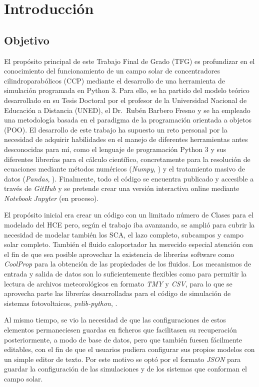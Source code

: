 \chapter{Introducción}
\label{introduccion}

\section{Objetivo}
El propósito principal de este Trabajo Final de Grado (TFG) es profundizar en el conocimiento del funcionamiento de un campo solar de concentradores cilindroparabólicos (CCP) mediante el desarrollo de una herramienta de simulación programada en Python 3. Para ello, se ha partido del modelo teórico desarrollado en su Tesis Doctoral por el profesor de la Universidad Nacional de Educación a Distancia (UNED), el Dr.~Rubén Barbero Fresno y se ha empleado una metodología basada en el paradigma de la programación orientada a objetos (POO). El desarrollo de este trabajo ha supuesto un reto personal por la necesidad de adquirir habilidades en el manejo de diferentes herramientas antes desconocidas para mí, como el lenguaje de programación Python 3 \cite{WelcomePythonOrg} y sus diferentes librerías para el cálculo científico, concretamente para la resolución de ecuaciones mediante métodos numéricos (\emph{Numpy}, \cite{NumPy}) y el tratamiento masivo de datos (\emph{Pandas},  \cite{PandasPythonData}). Finalmente, todo el código se encuentra publicado y accesible a través de \emph{GitHub} y se pretende crear una versión interactiva online mediante \emph{Notebook Jupyter} (en proceso).

El propósito inicial era crear un código con un limitado número de Clases para el modelado del HCE pero, según el trabajo iba avanzando, se amplió para cubrir la necesidad de modelar también los SCA, el lazo completo, subcampos y campo solar completo. También el fluido caloportador ha merecido especial atención con el fin de que sea posible aprovechar la existencia de librerías software como \emph{CoolProp} \cite{bellPurePseudopureFluid2014} para la obtención  de las propiedades de los fluidos. Los  mecanismos de entrada y salida de datos son lo suficientemente flexibles como para permitir la lectura de archivos meteorológicos en formato \emph{TMY} y \emph{CSV}, para lo que se aprovecha parte las librerías desarrolladas para el código de simulación de sistemas fotovoltaicos, \emph{pvlib-python}, \cite{holmgrenPvlibPythonPython2018}.

Al mismo tiempo, se vio la necesidad de que las configuraciones de estos elementos permaneciesen guardas en ficheros que facilitasen su recuperación posteriormente, a modo de base de datos, pero que también fuesen fácilmente editables, con el fin de que el usuarios pudiera configurar sus propios modelos con un simple editor de texto. Por este motivo se optó por el formato \emph{JSON} para guardar la configuración de las simulaciones y de los sistemas que conforman el campo solar.

